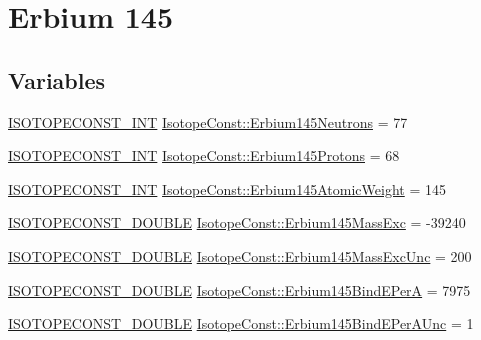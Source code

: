 \hypertarget{group___isotope_const-_erbium-_er145}{}\section{Erbium 145}
\label{group___isotope_const-_erbium-_er145}
\subsection*{Variables}
\begin{DoxyCompactItemize}
\item 
\mbox{\hyperlink{group___isotope_const-_macros_ga5f18360b3e99483a35c32d789e62621c}{I\+S\+O\+T\+O\+P\+E\+C\+O\+N\+S\+T\+\_\+\+I\+NT}} \mbox{\hyperlink{group___isotope_const-_erbium-_er145_ga94735b6515ba8580a8c33f1967e06854}{Isotope\+Const\+::\+Erbium145\+Neutrons}} = 77
\item 
\mbox{\hyperlink{group___isotope_const-_macros_ga5f18360b3e99483a35c32d789e62621c}{I\+S\+O\+T\+O\+P\+E\+C\+O\+N\+S\+T\+\_\+\+I\+NT}} \mbox{\hyperlink{group___isotope_const-_erbium-_er145_gaf41a5ec11969f1c852b4c407b116bdbf}{Isotope\+Const\+::\+Erbium145\+Protons}} = 68
\item 
\mbox{\hyperlink{group___isotope_const-_macros_ga5f18360b3e99483a35c32d789e62621c}{I\+S\+O\+T\+O\+P\+E\+C\+O\+N\+S\+T\+\_\+\+I\+NT}} \mbox{\hyperlink{group___isotope_const-_erbium-_er145_gad06c3b377ec1e079624b58a465ea09ff}{Isotope\+Const\+::\+Erbium145\+Atomic\+Weight}} = 145
\item 
\mbox{\hyperlink{group___isotope_const-_macros_ga8f45a7272ce02c0b4c65c44636ed719a}{I\+S\+O\+T\+O\+P\+E\+C\+O\+N\+S\+T\+\_\+\+D\+O\+U\+B\+LE}} \mbox{\hyperlink{group___isotope_const-_erbium-_er145_ga84a7ac75853e876ee48e97b9265e0a44}{Isotope\+Const\+::\+Erbium145\+Mass\+Exc}} = -\/39240
\item 
\mbox{\hyperlink{group___isotope_const-_macros_ga8f45a7272ce02c0b4c65c44636ed719a}{I\+S\+O\+T\+O\+P\+E\+C\+O\+N\+S\+T\+\_\+\+D\+O\+U\+B\+LE}} \mbox{\hyperlink{group___isotope_const-_erbium-_er145_ga0356fba029cb103c03a1371b5e48fdf1}{Isotope\+Const\+::\+Erbium145\+Mass\+Exc\+Unc}} = 200
\item 
\mbox{\hyperlink{group___isotope_const-_macros_ga8f45a7272ce02c0b4c65c44636ed719a}{I\+S\+O\+T\+O\+P\+E\+C\+O\+N\+S\+T\+\_\+\+D\+O\+U\+B\+LE}} \mbox{\hyperlink{group___isotope_const-_erbium-_er145_ga4eb8ce0abb9998b825ac9af99b6a0fb6}{Isotope\+Const\+::\+Erbium145\+Bind\+E\+PerA}} = 7975
\item 
\mbox{\hyperlink{group___isotope_const-_macros_ga8f45a7272ce02c0b4c65c44636ed719a}{I\+S\+O\+T\+O\+P\+E\+C\+O\+N\+S\+T\+\_\+\+D\+O\+U\+B\+LE}} \mbox{\hyperlink{group___isotope_const-_erbium-_er145_gaa33c78034cb854957d6f4236fce454e1}{Isotope\+Const\+::\+Erbium145\+Bind\+E\+Per\+A\+Unc}} = 1

\end{DoxyCompactItemize}
